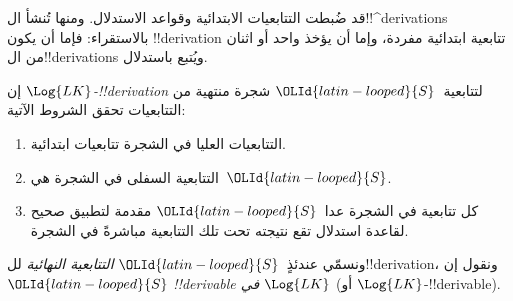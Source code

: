 \documentclass[../../../include/open-logic-section]{subfiles}
\begin{document}
      {}
      {}


\begin{explain}
قد ضُبطت التتابعيات الابتدائية وقواعد الاستدلال. ومنها تُنشأ ال!!^{derivation}s بالاستقراء:
فإما أن يكون !!{derivation} تتابعية ابتدائية مفردة، وإما أن يؤخذ واحد أو اثنان من ال!!{derivation}s ويُتبع باستدلال.
\end{explain}

\begin{defn}
إن \emph{$\Log{LK}$-!!{derivation}} لتتابعية~${\OLId{latin-looped}{S}}$ شجرة منتهية من
التتابعيات تحقق الشروط الآتية:
\begin{enumerate}
\item التتابعيات العليا في الشجرة تتابعيات ابتدائية.
\item التتابعية السفلى في الشجرة هي~${\OLId{latin-looped}{S}}$.
\item كل تتابعية في الشجرة عدا~${\OLId{latin-looped}{S}}$ مقدمة لتطبيق صحيح لقاعدة استدلال
  تقع نتيجته تحت تلك التتابعية مباشرةً في الشجرة.
\end{enumerate}
ونسمّي عندئذٍ~${\OLId{latin-looped}{S}}$ \emph{التتابعية النهائية} لل!!{derivation}، ونقول
إن~${\OLId{latin-looped}{S}}$ \emph{!!{derivable} في $\Log{LK}$} (أو
$\Log{LK}$-!!{derivable}).
\end{defn}
\end{document}
